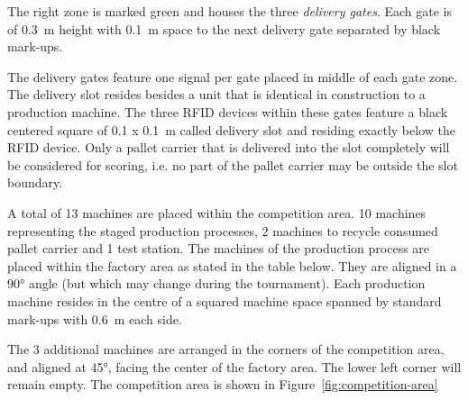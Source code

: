 \documentclass[12pt,twoside]{article}
\begin{document}
The right zone is marked green and houses the three \textit{delivery
  gates}.  Each gate is of \SI{0.3}{\metre} height with
\SI{0.1}{\metre} space to the next delivery gate separated by black
mark-ups.

The delivery gates feature one signal per gate placed in middle of
each gate zone. The delivery slot resides besides a unit that is
identical in construction to a production machine. The three RFID
devices within these gates feature a black centered square of \SI{0.1
  x 0.1}{\metre} called delivery slot and residing exactly below the
RFID device. Only a pallet carrier that is delivered into the slot
completely will be considered for scoring, i.e. no part of the pallet
carrier may be outside the slot boundary.

A total of 13 machines are placed within the competition area. 10
machines representing the staged production processes, 2 machines to
recycle consumed pallet carrier and 1 test station. The machines of
the production process are placed within the factory area as stated in
the table below. They are aligned in a \ang{90} angle (but which may
change during the tournament). Each production machine resides in the
centre of a squared machine space spanned by standard mark-ups with
\SI{0.6}{\metre} each side.

The 3 additional machines are arranged in the corners of the
competition area, and aligned at \ang{45}, facing the center of the
factory area. The lower left corner will remain empty. The competition
area is shown in Figure~\ref{fig:competition-area}
\end{document}
